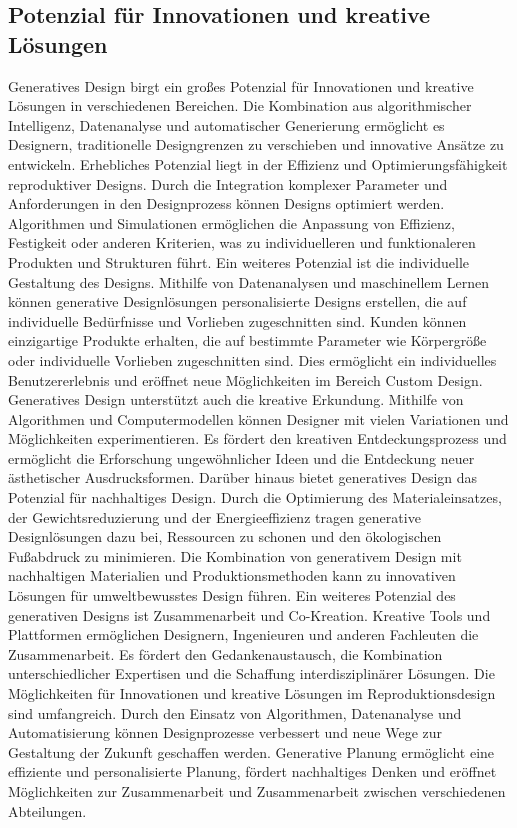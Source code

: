  \subsection*{Potenzial für Innovationen und kreative Lösungen}
 Generatives Design birgt ein großes Potenzial für Innovationen und kreative Lösungen in verschiedenen Bereichen. Die Kombination aus algorithmischer Intelligenz, Datenanalyse und automatischer Generierung ermöglicht es Designern, traditionelle Designgrenzen zu verschieben und innovative Ansätze zu entwickeln. 
 Erhebliches Potenzial liegt in der Effizienz und Optimierungsfähigkeit reproduktiver Designs. Durch die Integration komplexer Parameter und Anforderungen in den Designprozess können Designs optimiert werden. Algorithmen und Simulationen ermöglichen die Anpassung von Effizienz, Festigkeit oder anderen Kriterien, was zu individuelleren und funktionaleren Produkten und Strukturen führt.  Ein weiteres Potenzial ist die individuelle Gestaltung des Designs. Mithilfe von Datenanalysen und maschinellem Lernen können generative Designlösungen personalisierte Designs erstellen, die auf individuelle Bedürfnisse und Vorlieben zugeschnitten sind. Kunden können einzigartige Produkte erhalten, die auf bestimmte Parameter wie Körpergröße oder individuelle Vorlieben zugeschnitten sind. Dies ermöglicht ein individuelles Benutzererlebnis und eröffnet neue Möglichkeiten im Bereich Custom Design. 
 Generatives Design unterstützt auch die kreative Erkundung. Mithilfe von Algorithmen und Computermodellen können Designer mit vielen Variationen und Möglichkeiten experimentieren. Es fördert den kreativen Entdeckungsprozess und ermöglicht die Erforschung ungewöhnlicher Ideen  und die Entdeckung neuer ästhetischer Ausdrucksformen. 
 Darüber hinaus bietet generatives Design das Potenzial für nachhaltiges Design. Durch die Optimierung des Materialeinsatzes, der Gewichtsreduzierung und der Energieeffizienz tragen generative Designlösungen dazu bei, Ressourcen zu schonen und den ökologischen Fußabdruck zu minimieren. Die Kombination von generativem Design mit nachhaltigen Materialien und Produktionsmethoden kann zu innovativen Lösungen für umweltbewusstes Design führen. Ein weiteres Potenzial des generativen Designs ist Zusammenarbeit und Co-Kreation. Kreative Tools und Plattformen ermöglichen Designern, Ingenieuren und anderen Fachleuten die Zusammenarbeit. Es fördert den Gedankenaustausch, die Kombination unterschiedlicher Expertisen und die Schaffung interdisziplinärer Lösungen. 
 Die Möglichkeiten für Innovationen und kreative Lösungen im Reproduktionsdesign sind umfangreich. Durch den Einsatz von Algorithmen, Datenanalyse und Automatisierung können Designprozesse verbessert und neue Wege zur Gestaltung der Zukunft geschaffen werden. Generative Planung ermöglicht eine effiziente und personalisierte Planung, fördert nachhaltiges Denken und eröffnet Möglichkeiten zur Zusammenarbeit und Zusammenarbeit zwischen verschiedenen Abteilungen.